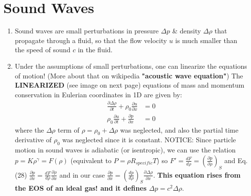 ﻿\documentclass[11pt]{article}
\begin{document}
\section{Sound Waves}
\begin{enumerate}
  \item Sound waves are small perturbations in pressure $\Delta p$ \& density $\Delta \rho$ that propagate through a fluid, so that the flow velocity $u$ is much smaller than the speed of sound $c$ in the fluid.
  \item Under the assumptions of small perturbations, one can linearize the equations of motion! (More about that on wikipedia \textbf{"acoustic wave equation"}) The \textbf{LINEARIZED} (see image on next page) equations of mass and momentum conservation in Eulerian coordinates in 1D are given by:
  \begin{align}
    \frac{\partial \Delta \rho}{\partial t} + \rho_0 \frac{\partial u}{\partial x} &= 0 \label{Eq} \\
    \rho_0 \frac{\partial u}{\partial t} + \frac{\partial p}{\partial x} &= 0 \nonumber
  \end{align}
  where the $\Delta \rho$ term of $\rho = \rho_0 + \Delta \rho$ was neglected, and also the partial time derivative of $\rho_0$ was neglected since it is constant.
  NOTICE: Since particle motion in sound waves is adiabatic (or isentropic), we can use the relation $p = K \rho^\gamma = F(\rho)$ (equivalent to $P=\rho R_{specific} T$) so $F'=\frac{dF}{d\rho} = (\frac{\partial p}{\partial \rho})_S$ and Eq.(28) $\frac{\partial p}{\partial x} = \frac{dF}{d\rho} \frac{\partial \rho}{\partial x}$ and in our case $\frac{\partial p}{\partial x} = (\frac{dp}{d\rho})_S \frac{\partial \Delta \rho}{\partial x}$. \textbf{This equation rises from the EOS of an ideal gas! and it defines $\Delta p = c^2 \Delta \rho$}.
\end{enumerate}
\end{document}
